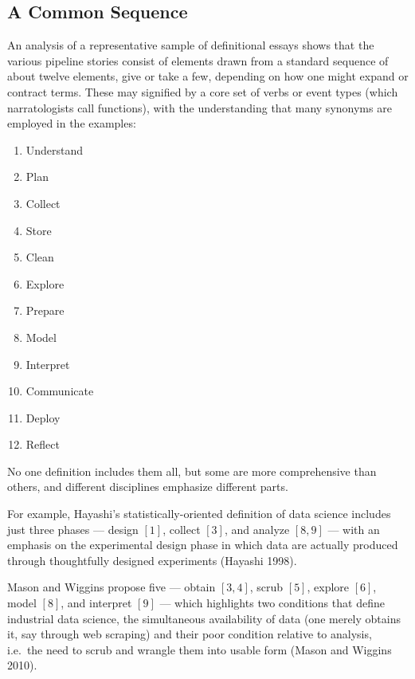 \documentclass[
  letterpaper,
  DIV=11,
  numbers=noendperiod]{scrreprt}
\providecommand{\tightlist}{%
  \setlength{\itemsep}{0pt}\setlength{\parskip}{0pt}}\usepackage{longtable,booktabs,array}
\begin{document}
\hypertarget{a-common-sequence}{%
\subsection{A Common Sequence}\label{a-common-sequence}}

An analysis of a representative sample of definitional essays shows that
the various pipeline stories consist of elements drawn from a standard
sequence of about twelve elements, give or take a few, depending on how
one might expand or contract terms. These may signified by a core set of
verbs or event types (which narratologists call functions), with the
understanding that many synonyms are employed in the examples:

\begin{enumerate}
\def\labelenumi{\arabic{enumi}.}
\tightlist
\item
  Understand
\item
  Plan
\item
  Collect
\item
  Store
\item
  Clean
\item
  Explore
\item
  Prepare
\item
  Model
\item
  Interpret
\item
  Communicate
\item
  Deploy
\item
  Reflect
\end{enumerate}

No one definition includes them all, but some are more comprehensive
than others, and different disciplines emphasize different parts.

For example, Hayashi's statistically-oriented definition of data science
includes just three phases --- design \([1]\), collect \([3]\), and
analyze \([8, 9]\) --- with an emphasis on the experimental design phase
in which data are actually produced through thoughtfully designed
experiments (Hayashi 1998).

Mason and Wiggins propose five --- obtain \([3, 4]\), scrub \([5]\),
explore \([6]\), model \([8]\), and interpret \([9]\) --- which
highlights two conditions that define industrial data science, the
simultaneous availability of data (one merely obtains it, say through
web scraping) and their poor condition relative to analysis, i.e.~the
need to scrub and wrangle them into usable form (Mason and Wiggins
2010).
\end{document}
